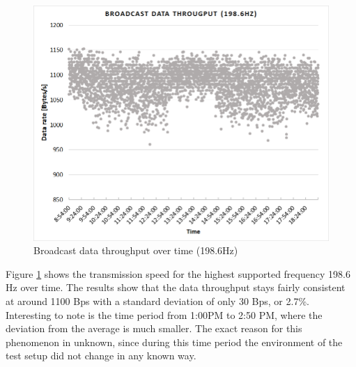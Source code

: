 \begin{description}
	\begin{figure}[H]
		\centering
		\includegraphics[scale=0.5]{content/images/exp1_long.png}
		\caption{Broadcast data throughput over time (198.6Hz)}\label{fig:exp1long}
	\end{figure}
	Figure \ref{fig:exp1long} shows the transmission speed for the highest supported frequency 198.6 Hz over time. The results show that the data throughput stays fairly consistent at around 1100 Bps with a standard deviation of only 30 Bps, or 2.7\%. Interesting to note is the time period from 1:00PM to 2:50 PM, where the deviation from the average is much smaller. The exact reason for this phenomenon in unknown, since during this time period the environment of the test setup did not change in any known way.
\end{description}
\newpage

